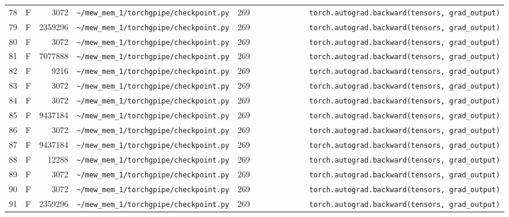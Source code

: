 \documentclass{article}
\begin{document}
\begin{longtable}{r l r p{6.5cm} r p{7.0cm}}
78 & F & 3072 & \lstinline|~/mew_mem_1/torchgpipe/checkpoint.py| & 269 & \lstinline|            torch.autograd.backward(tensors, grad_output)| \\
79 & F & 2359296 & \lstinline|~/mew_mem_1/torchgpipe/checkpoint.py| & 269 & \lstinline|            torch.autograd.backward(tensors, grad_output)| \\
80 & F & 3072 & \lstinline|~/mew_mem_1/torchgpipe/checkpoint.py| & 269 & \lstinline|            torch.autograd.backward(tensors, grad_output)| \\
81 & F & 7077888 & \lstinline|~/mew_mem_1/torchgpipe/checkpoint.py| & 269 & \lstinline|            torch.autograd.backward(tensors, grad_output)| \\
82 & F & 9216 & \lstinline|~/mew_mem_1/torchgpipe/checkpoint.py| & 269 & \lstinline|            torch.autograd.backward(tensors, grad_output)| \\
83 & F & 3072 & \lstinline|~/mew_mem_1/torchgpipe/checkpoint.py| & 269 & \lstinline|            torch.autograd.backward(tensors, grad_output)| \\
84 & F & 3072 & \lstinline|~/mew_mem_1/torchgpipe/checkpoint.py| & 269 & \lstinline|            torch.autograd.backward(tensors, grad_output)| \\
85 & F & 9437184 & \lstinline|~/mew_mem_1/torchgpipe/checkpoint.py| & 269 & \lstinline|            torch.autograd.backward(tensors, grad_output)| \\
86 & F & 3072 & \lstinline|~/mew_mem_1/torchgpipe/checkpoint.py| & 269 & \lstinline|            torch.autograd.backward(tensors, grad_output)| \\
87 & F & 9437184 & \lstinline|~/mew_mem_1/torchgpipe/checkpoint.py| & 269 & \lstinline|            torch.autograd.backward(tensors, grad_output)| \\
88 & F & 12288 & \lstinline|~/mew_mem_1/torchgpipe/checkpoint.py| & 269 & \lstinline|            torch.autograd.backward(tensors, grad_output)| \\
89 & F & 3072 & \lstinline|~/mew_mem_1/torchgpipe/checkpoint.py| & 269 & \lstinline|            torch.autograd.backward(tensors, grad_output)| \\
90 & F & 3072 & \lstinline|~/mew_mem_1/torchgpipe/checkpoint.py| & 269 & \lstinline|            torch.autograd.backward(tensors, grad_output)| \\
91 & F & 2359296 & \lstinline|~/mew_mem_1/torchgpipe/checkpoint.py| & 269 & \lstinline|            torch.autograd.backward(tensors, grad_output)| \\

\end{longtable}
\end{document}
